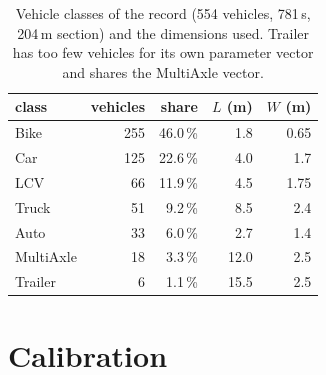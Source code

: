\documentclass[11pt]{article}
\begin{document}
\begin{table}[H]\centering\footnotesize
\caption{Vehicle classes of the record (554 vehicles, 781\,s, 204\,m section)
and the dimensions used. Trailer has too few vehicles
for its own parameter vector and shares the MultiAxle vector.}
\label{tab:dims}
\begin{tabular}{@{}lrrrr@{}}
\toprule
class & vehicles & share & $L$ (m) & $W$ (m)\\
\midrule
Bike & 255 & 46.0\,\% & 1.8 & 0.65\\
Car & 125 & 22.6\,\% & 4.0 & 1.7\\
LCV & 66 & 11.9\,\% & 4.5 & 1.75\\
Truck & 51 & 9.2\,\% & 8.5 & 2.4\\
Auto & 33 & 6.0\,\% & 2.7 & 1.4\\
MultiAxle & 18 & 3.3\,\% & 12.0 & 2.5\\
Trailer & 6 & 1.1\,\% & 15.5 & 2.5\\
\bottomrule
\end{tabular}
\end{table}

\section{Calibration}
\label{sec:calib}
\end{document}
